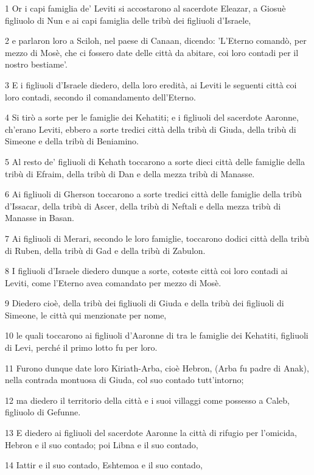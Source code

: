 \par 1 Or i capi famiglia de' Leviti si accostarono al sacerdote Eleazar, a Giosuè figliuolo di Nun e ai capi famiglia delle tribù dei figliuoli d'Israele,
\par 2 e parlaron loro a Sciloh, nel paese di Canaan, dicendo: 'L'Eterno comandò, per mezzo di Mosè, che ci fossero date delle città da abitare, coi loro contadi per il nostro bestiame'.
\par 3 E i figliuoli d'Israele diedero, della loro eredità, ai Leviti le seguenti città coi loro contadi, secondo il comandamento dell'Eterno.
\par 4 Si tirò a sorte per le famiglie dei Kehatiti; e i figliuoli del sacerdote Aaronne, ch'erano Leviti, ebbero a sorte tredici città della tribù di Giuda, della tribù di Simeone e della tribù di Beniamino.
\par 5 Al resto de' figliuoli di Kehath toccarono a sorte dieci città delle famiglie della tribù di Efraim, della tribù di Dan e della mezza tribù di Manasse.
\par 6 Ai figliuoli di Gherson toccarono a sorte tredici città delle famiglie della tribù d'Issacar, della tribù di Ascer, della tribù di Neftali e della mezza tribù di Manasse in Basan.
\par 7 Ai figliuoli di Merari, secondo le loro famiglie, toccarono dodici città della tribù di Ruben, della tribù di Gad e della tribù di Zabulon.
\par 8 I figliuoli d'Israele diedero dunque a sorte, coteste città coi loro contadi ai Leviti, come l'Eterno avea comandato per mezzo di Mosè.
\par 9 Diedero cioè, della tribù dei figliuoli di Giuda e della tribù dei figliuoli di Simeone, le città qui menzionate per nome,
\par 10 le quali toccarono ai figliuoli d'Aaronne di tra le famiglie dei Kehatiti, figliuoli di Levi, perché il primo lotto fu per loro.
\par 11 Furono dunque date loro Kiriath-Arba, cioè Hebron, (Arba fu padre di Anak), nella contrada montuosa di Giuda, col suo contado tutt'intorno;
\par 12 ma diedero il territorio della città e i suoi villaggi come possesso a Caleb, figliuolo di Gefunne.
\par 13 E diedero ai figliuoli del sacerdote Aaronne la città di rifugio per l'omicida, Hebron e il suo contado; poi Libna e il suo contado,
\par 14 Iattir e il suo contado, Eshtemoa e il suo contado,
